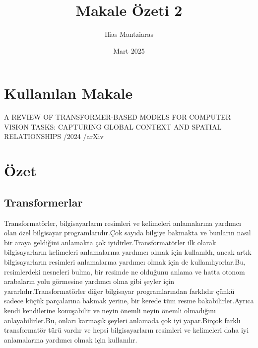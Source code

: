 \documentclass{article}
\title{Makale Özeti 2}
\author{Ilias Mantziaras}
\date{Mart 2025}
\begin{document}
\maketitle

\section{Kullanılan Makale}
A REVIEW OF TRANSFORMER-BASED MODELS FOR COMPUTER VISION TASKS: CAPTURING GLOBAL CONTEXT AND SPATIAL RELATIONSHIPS
/2024
/arXiv

\section{Özet}
\subsection{Transformerlar}
Transformatörler, bilgisayarların resimleri ve kelimeleri anlamalarına yardımcı olan özel bilgisayar programlarıdır.Çok sayıda bilgiye bakmakta ve bunların nasıl bir araya geldiğini anlamakta çok iyidirler.Transformatörler ilk olarak bilgisayarların kelimeleri anlamalarına yardımcı olmak için kullanıldı, ancak artık bilgisayarların resimleri anlamalarına yardımcı olmak için de kullanılıyorlar.Bu, resimlerdeki nesneleri bulma, bir resimde ne olduğunu anlama ve hatta otonom
arabaların yolu görmesine yardımcı olma gibi şeyler için yararlıdır.Transformatörler diğer bilgisayar programlarından farklıdır çünkü sadece küçük parçalarına bakmak yerine, bir kerede tüm resme bakabilirler.Ayrıca kendi kendilerine konuşabilir ve neyin önemli neyin önemli olmadığını anlayabilirler.Bu, onları karmaşık şeyleri anlamada çok iyi yapar.Birçok farklı transformatör türü vardır ve hepsi bilgisayarların resimleri ve kelimeleri daha iyi anlamalarına yardımcı olmak için 
kullanılır.
\end{document}
